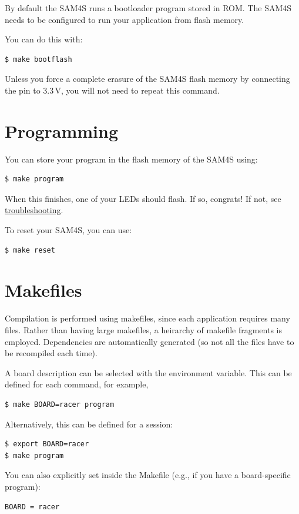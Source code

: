 By default the SAM4S runs a bootloader program stored in ROM. The SAM4S
needs to be configured to run your application from flash memory.

You can do this with:

\begin{verbatim}
$ make bootflash
\end{verbatim}


Unless you force a complete erasure of the SAM4S flash memory by
connecting the  pin to 3.3\,V, you will not need to repeat
this command.

\section{Programming}
\label{programming}

You can store your program in the flash memory of the SAM4S using:

\begin{verbatim}
$ make program
\end{verbatim}

When this finishes, one of your LEDs should flash. If so, congrats! If
not, see \protect\hyperref[troubleshooting]{troubleshooting}.

To reset your SAM4S, you can use:
%
\begin{verbatim}
$ make reset
\end{verbatim}


\section{Makefiles}

Compilation is performed using makefiles, since each application
requires many files.  Rather than having large makefiles, a heirarchy
of makefile fragments is employed.  Dependencies are automatically
generated (so not all the files have to be recompiled each time).

A board description can be selected with the  environment
variable.  This can be defined for each command, for example,
%
\begin{verbatim}
$ make BOARD=racer program
\end{verbatim}


Alternatively, this can be defined for a session:
%
\begin{verbatim}
$ export BOARD=racer
$ make program
\end{verbatim}

You can also explicitly set  inside the Makefile (e.g., if
you have a board-specific program):
%
\begin{verbatim}
BOARD = racer
\end{verbatim}

